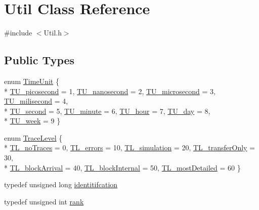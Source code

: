 \hypertarget{class_util}{\section{Util Class Reference}
\label{class_util}
}


{\ttfamily \#include $<$Util.\-h$>$}

\subsection*{Public Types}
\begin{DoxyCompactItemize}
\item 
enum \hyperlink{class_util_aadbd82055afeaa7d4fb4da513de628ff}{Time\-Unit} \{ \\*
\hyperlink{class_util_aadbd82055afeaa7d4fb4da513de628ffa61a2b7f78d5154e21558eeb7f7dcf189}{T\-U\-\_\-picosecond} = 1, 
\hyperlink{class_util_aadbd82055afeaa7d4fb4da513de628ffa180a2c9d13a0f09f4736faadcf647652}{T\-U\-\_\-nanosecond} = 2, 
\hyperlink{class_util_aadbd82055afeaa7d4fb4da513de628ffaea45c265b26be1b824e13c8c0197c596}{T\-U\-\_\-microsecond} = 3, 
\hyperlink{class_util_aadbd82055afeaa7d4fb4da513de628ffab2d1939f8eede127ea155ff7377a6408}{T\-U\-\_\-milisecond} = 4, 
\\*
\hyperlink{class_util_aadbd82055afeaa7d4fb4da513de628ffa2b8682aecb882a22a72fa80cee868574}{T\-U\-\_\-second} = 5, 
\hyperlink{class_util_aadbd82055afeaa7d4fb4da513de628ffa8a8dec2e0147e6d1d6de316c6607022c}{T\-U\-\_\-minute} = 6, 
\hyperlink{class_util_aadbd82055afeaa7d4fb4da513de628ffaed08a13fb576de0d635c1ada62e6ed64}{T\-U\-\_\-hour} = 7, 
\hyperlink{class_util_aadbd82055afeaa7d4fb4da513de628ffa7c189f7f3cfd7d611da081990ebd3971}{T\-U\-\_\-day} = 8, 
\\*
\hyperlink{class_util_aadbd82055afeaa7d4fb4da513de628ffa556642171373fb32274a3ff32e9818a9}{T\-U\-\_\-week} = 9
 \}
\item 
enum \hyperlink{class_util_a604561d00f5999b5ca280401140e58d9}{Trace\-Level} \{ \\*
\hyperlink{class_util_a604561d00f5999b5ca280401140e58d9ae16cd2d59f52612b89b7a094bf6ed758}{T\-L\-\_\-no\-Traces} = 0, 
\hyperlink{class_util_a604561d00f5999b5ca280401140e58d9a301dc2838784fa24261650a639c11cf1}{T\-L\-\_\-errors} = 10, 
\hyperlink{class_util_a604561d00f5999b5ca280401140e58d9a4b58bddec93bc38da370802e995c3e60}{T\-L\-\_\-simulation} = 20, 
\hyperlink{class_util_a604561d00f5999b5ca280401140e58d9a8b8962b6e41245523e7d7b967f582272}{T\-L\-\_\-transfer\-Only} = 30, 
\\*
\hyperlink{class_util_a604561d00f5999b5ca280401140e58d9a3a33606fc3e2b432131173eeed280d9a}{T\-L\-\_\-block\-Arrival} = 40, 
\hyperlink{class_util_a604561d00f5999b5ca280401140e58d9a3bf34b905a3128734e417619af900d0e}{T\-L\-\_\-block\-Internal} = 50, 
\hyperlink{class_util_a604561d00f5999b5ca280401140e58d9a64fd55e7b2e7fa00956ebc5185cef8b0}{T\-L\-\_\-most\-Detailed} = 60
 \}
\item 
typedef unsigned long \hyperlink{class_util_ad17d458d9344b10bba64347e514d6d71}{identitifcation}
\item 
typedef unsigned int \hyperlink{class_util_a2a402b3a3a889d699bb3a1a87cbe6d1e}{rank}
\end{DoxyCompactItemize}
